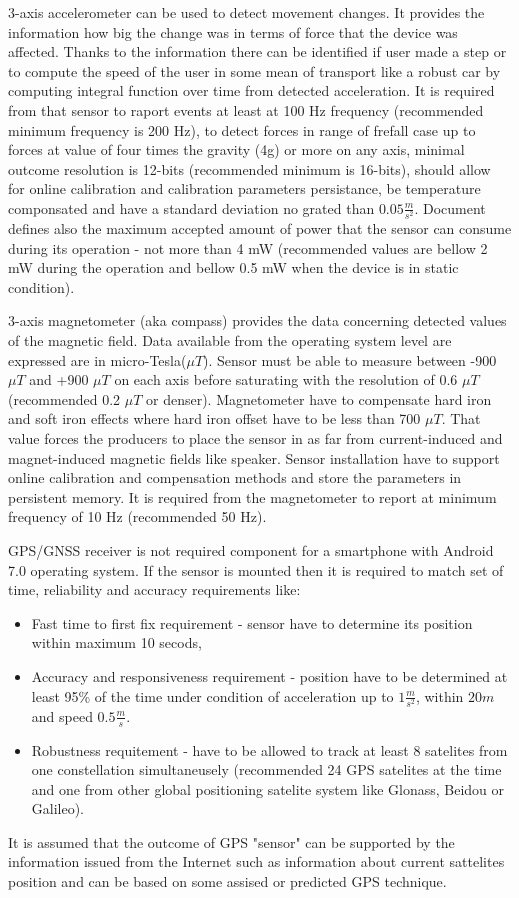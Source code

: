 \documentclass[../main.tex]{subfiles}
\begin{document}
3-axis accelerometer can be used to detect movement changes. It provides the information how big the change was in terms of force that the device was affected. Thanks to the information there can be identified if user made a step or to compute the speed of the user in some mean of transport like a robust car by computing integral function over time from detected acceleration. It is required from that sensor to raport events at least at 100 Hz frequency (recommended minimum frequency is 200 Hz), to detect forces in range of frefall case up to forces at value of four times the gravity (4g) or more on any axis, minimal outcome resolution is 12-bits (recommended minimum is 16-bits), should allow for online calibration and calibration parameters persistance, be temperature componsated and have a standard deviation no grated than $ 0.05 \frac{m}{s^2} $. Document defines also the maximum accepted amount of power that the sensor can consume during its operation - not more than 4 mW (recommended values are bellow 2 mW during the operation and bellow 0.5 mW when the device is in static condition).

3-axis magnetometer (aka compass) provides the data concerning detected values of the magnetic field. Data available from the operating system level are expressed are in micro-Tesla($\mu T$). Sensor must be able to measure between -900 $\mu T$ and +900 $\mu T$ on each axis before saturating with the resolution of 0.6 $\mu T$ (recommended 0.2 $\mu T$ or denser). Magnetometer have to compensate hard iron and soft iron effects where hard iron offset have to be less than 700 $\mu T$. That value forces the producers to place the sensor in as far from current-induced and magnet-induced magnetic fields like speaker. Sensor installation have to support online calibration and compensation methods and store the parameters in persistent memory. It is required from the magnetometer to report at minimum frequency of 10 Hz (recommended 50 Hz).

GPS/GNSS receiver is not required component for a smartphone with Android 7.0 operating system. If the sensor is mounted then it is required to match set of time, reliability and accuracy requirements like:
\begin{itemize}
	\item Fast time to first fix requirement - sensor have to determine its position within maximum 10 secods,
	\item Accuracy and responsiveness requirement - position have to be determined at least 95\% of the time under condition of acceleration up to $ 1 \frac{m}{s^2} $, within $ 20 m $ and speed $ 0.5 \frac{m}{s} $.
	\item Robustness requitement - have to be allowed to track at least 8 satelites from one constellation simultaneusely (recommended 24 GPS satelites at the time and one from other global positioning satelite system like Glonass, Beidou or Galileo).
\end{itemize}
It is assumed that the outcome of GPS "sensor" can be supported by the information issued from the Internet such as information about current sattelites position and can be based on some assised or predicted GPS technique.
\end{document}
